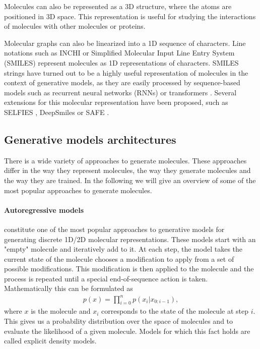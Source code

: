 Molecules can also be represented as a 3D structure, where the atoms are
positioned in 3D space. This representation is useful for studying the
interactions of molecules with other molecules or proteins. 

Molecular graphs can also be linearized into a 1D sequence of characters. Line
notations such as INCHI \citep{todo} or Simplified Molecular Input Line Entry
System (SMILES) \citep{weiningerSMILESChemicalLanguage1988} represent molecules
as 1D representations of characters. SMILES strings have turned out to be a
highly useful representation of molecules in the context of generative models,
as they are easily processed by sequence-based models such as recurrent neural
networks (RNNs) or transformers \citep{vaswaniAttentionAllYou2017}. Several
extensions for this molecular representation have been proposed, such as SELFIES
\citep{krennSELFIESFutureMolecular2022}, DeepSmiles
\citep{oboyleDeepSMILESAdaptationSMILES2018} or SAFE
\citep{noutahiGottaBeSAFE2023}. 

\subsection{Generative models architectures}
There is a wide variety of approaches to generate molecules. These approaches
differ in the way they represent molecules, the way they generate molecules
and the way they are trained. In the following we will give an overview of
some of the most popular approaches to generate molecules. 

\paragraph{Autoregressive models} constitute one of the most popular approaches
to generative models for generating discrete 1D/2D molecular representations. 
These models start with an "empty" molecule and iteratively add to it. 
At each step, the model takes the current state of the molecule chooses 
a modification to apply from a set of possible modifications. This modification
is then applied to the molecule and the process is repeated until a special
end-of-sequence action is taken. Mathematically this can be formulated as
\begin{align}
    p(x) = \prod_{i=0}^n p(x_i | x_{0:i-1}), 
\end{align}
where $x$ is the molecule and $x_i$ corresponds to the state of the molecule 
at step $i$. This gives us a probability distribution over the space of molecules
and to evaluate the likelihood of a given molecule. Models for which this fact 
holds are called explicit density models.

